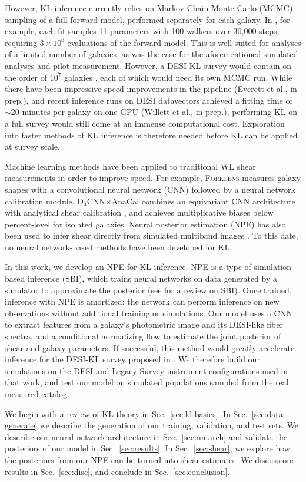 However, KL inference currently relies on Markov Chain Monte Carlo (MCMC) sampling of a full forward model, performed separately for each galaxy. In \citep{KLInferenceI}, for example, each fit samples 11 parameters with 100 walkers over 30,000 steps, requiring $3\times10^6$ evaluations of the forward model. This is well suited for analyses of a limited number of galaxies, as was the case for the aforementioned simulated analyses and pilot measurement. However, a DESI-KL survey would contain on the order of $10^7$ galaxies \citep{KLDESI}, each of which would need its own MCMC run. While there have been impressive speed improvements in the pipeline (Everett et al., in prep.), and recent inference runs on DESI datavectors achieved a fitting time of $\sim$20 minutes per galaxy on one GPU (Willett et al., in prep.), performing KL on a full survey would still come at an immense computational cost. Exploration into faster methods of KL inference is therefore needed before KL can be applied at survey scale.

Machine learning methods have been applied to traditional WL shear measurements in order to improve speed. For example, \textsc{Forklens} \citep{Forklens} measures galaxy shapes with a convolutional neural network (CNN) followed by a neural network calibration module. D$_4$CNN$\times$AnaCal \citep{D4CNN} combines an equivariant CNN architecture with analytical shear calibration \citep{Anacal}, and achieves multiplicative biases below percent-level for isolated galaxies. Neural posterior estimation (NPE) has also been used to infer shear directly from simulated multiband images \citep{NPEShear}. To this date, no neural network-based methods have been developed for KL.

In this work, we develop an NPE for KL inference. NPE is a type of simulation-based inference (SBI), which trains neural networks on data generated by a simulator to approximate the posterior (see \citep{SBIGuide} for a review on SBI). Once trained, inference with NPE is amortized: the network can perform inference on new observations without additional training or simulations. Our model uses a CNN to extract features from a galaxy's photometric image and its DESI-like fiber spectra, and a conditional normalizing flow to estimate the joint posterior of shear and galaxy parameters. If successful, this method would greatly accelerate inference for the DESI-KL survey proposed in \citep{KLDESI}. We therefore build our simulations on the DESI and Legacy Survey instrument configurations used in that work, and test our model on simulated populations sampled from the real measured catalog.

We begin with a review of KL theory in Sec.~\ref{sec:kl-basics}. In Sec.~\ref{sec:data-generate} we describe the generation of our training, validation, and test sets. We describe our neural network architecture in Sec.~\ref{sec:nn-arch} and validate the posteriors of our model in Sec.~\ref{sec:results}. In Sec.~\ref{sec:shear}, we explore how the posteriors from our NPE can be turned into shear estimates. We discuss our results in Sec.~\ref{sec:disc}, and conclude in Sec.~\ref{sec:conclusion}.
